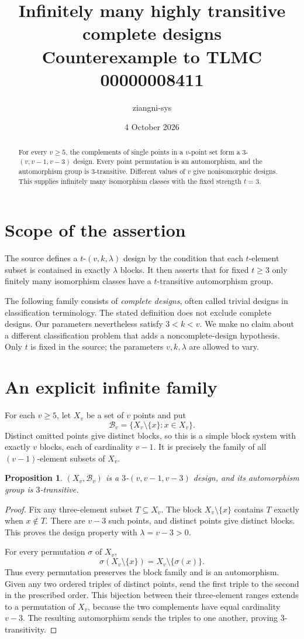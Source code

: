 \documentclass[11pt,a4paper]{article}
\title{Infinitely many highly transitive complete designs\\\large Counterexample to TLMC 00000008411}
\author{ziangni-sys}
\date{4 October 2026}
\newtheorem{proposition}{Proposition}
\begin{document}
\maketitle
\begin{abstract}
For every $v\geq5$, the complements of single points in a $v$-point
set form a $3$-$(v,v-1,v-3)$ design. Every point permutation is an
automorphism, and the automorphism group is $3$-transitive. Different
values of $v$ give nonisomorphic designs. This supplies infinitely many
isomorphism classes with the fixed strength $t=3$.
\end{abstract}

\section{Scope of the assertion}
The source defines a $t$-$(v,k,\lambda)$ design by the condition that
each $t$-element subset is contained in exactly $\lambda$ blocks. It
then asserts that for fixed $t\geq3$ only finitely many isomorphism
classes have a $t$-transitive automorphism group.

The following family consists of \emph{complete designs}, often called
trivial designs in classification terminology. The stated definition
does not exclude complete designs. Our parameters nevertheless satisfy
$3<k<v$. We make no claim about a different classification problem that
adds a noncomplete-design hypothesis. Only $t$ is fixed in the source;
the parameters $v,k,\lambda$ are allowed to vary.

\section{An explicit infinite family}
For each $v\geq5$, let $X_v$ be a set of $v$ points and put
\[
 \mathcal B_v=\{X_v\setminus\{x\}:x\in X_v\}.
\]
Distinct omitted points give distinct blocks, so this is a simple
block system with exactly $v$ blocks, each of cardinality $v-1$.
It is precisely the family of all $(v-1)$-element subsets of $X_v$.

\begin{proposition}
$(X_v,\mathcal B_v)$ is a $3$-$(v,v-1,v-3)$ design, and its
automorphism group is $3$-transitive.
\end{proposition}
\begin{proof}
Fix any three-element subset $T\subseteq X_v$. The block
$X_v\setminus\{x\}$ contains $T$ exactly when $x\notin T$.
There are $v-3$ such points, and distinct points give distinct blocks.
This proves the design property with $\lambda=v-3>0$.

For every permutation $\sigma$ of $X_v$,
\[
 \sigma(X_v\setminus\{x\})=X_v\setminus\{\sigma(x)\}.
\]
Thus every permutation preserves the block family and is an
automorphism. Given any two ordered triples of distinct points, send
the first triple to the second in the prescribed order. This bijection
between their three-element ranges extends to a permutation of $X_v$,
because the two complements have equal cardinality $v-3$.
The resulting automorphism sends the triples to one another, proving
$3$-transitivity.
\end{proof}
\end{document}
